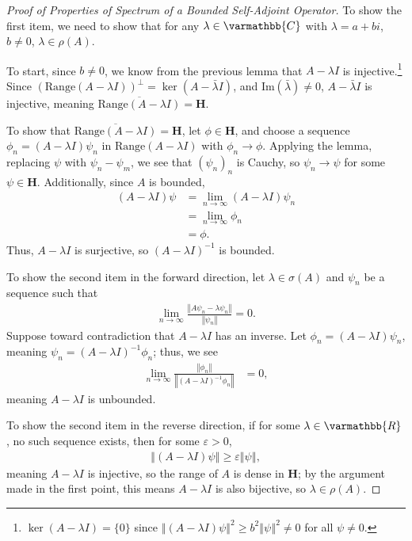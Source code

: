 \documentclass[12pt]{extarticle}
\newcommand{\R}{\varmathbb{R}}
\newcommand{\C}{\varmathbb{C}}
\newcommand{\norm}[1]{\left\Vert #1\right\Vert}
\theoremstyle{plain}
\theoremstyle{definition}
\theoremstyle{remark}
\renewcommand{\newline}{\hfill\break}
\begin{document}
  \begin{proof}[Proof of Properties of Spectrum of a Bounded Self-Adjoint Operator]
    To show the first item, we need to show that for any $\lambda \in \C$ with $\lambda = a + bi$, $b \neq 0$, $\lambda \in \rho(A)$.\newline

    To start, since $b\neq 0$, we know from the previous lemma that $A - \lambda I$ is injective.\footnote{$\ker(A - \lambda I) = \{0\}$ since $\norm{(A-\lambda I)\psi}^2 \geq b^2\norm{\psi}^2 \neq 0$ for all $\psi \neq 0$.} Since $\left(\text{Range}(A - \lambda I)\right)^{\perp} = \ker(A - \bar{\lambda}I)$, and $\text{Im}(\bar{\lambda}) \neq 0$, $A - \bar{\lambda} I$ is injective, meaning $\overline{\text{Range}(A - \lambda I)} = \mathbf{H}$.\newline

    To show that $\overline{\text{Range}(A - \lambda I)} = \mathbf{H}$, let $\phi \in \mathbf{H}$, and choose a sequence $\phi_n = (A - \lambda I)\psi_n$ in $\text{Range}(A - \lambda I)$ with $\phi_n \rightarrow \phi$. Applying the lemma, replacing $\psi$ with $\psi_n - \psi_m$, we see that $(\psi_n)_n$ is Cauchy, so $\psi_n \rightarrow \psi$ for some $\psi \in \mathbf{H}$. Additionally, since $A$ is bounded,
    \begin{align*}
      (A - \lambda I)\psi &= \lim_{n\rightarrow\infty}(A - \lambda I)\psi_n\\
                          &= \lim_{n\rightarrow\infty}\phi_n\\
                          &= \phi.
    \end{align*}
    Thus, $A - \lambda I$ is surjective, so $(A - \lambda I)^{-1}$ is bounded.\newline

    To show the second item in the forward direction, let $\lambda \in \sigma(A)$ and $\psi_n$ be a sequence such that
    \begin{align*}
      \lim_{n\rightarrow\infty}\frac{\norm{A\psi_n - \lambda \psi_n}}{\norm{\psi_n}} = 0.
    \end{align*}
    Suppose toward contradiction that $A - \lambda I$ has an inverse. Let $\phi_n = (A - \lambda I)\psi_n$, meaning $\psi_n = (A - \lambda I)^{-1}\phi_n$; thus, we see
    \begin{align*}
      \lim_{n\rightarrow\infty}\frac{\norm{\phi_n}}{\norm{(A - \lambda I)^{-1}\phi_n}} &= 0,
    \end{align*}
    meaning $A - \lambda I$ is unbounded.\newline

    To show the second item in the reverse direction, if for some $\lambda \in \R$, no such sequence exists, then for some $\varepsilon > 0$,
    \begin{align*}
      \norm{(A - \lambda I)\psi} \geq \varepsilon \norm{\psi},
    \end{align*}
    meaning $A - \lambda I$ is injective, so the range of $A$ is dense in $\mathbf{H}$; by the argument made in the first point, this means $A - \lambda I$ is also bijective, so $\lambda \in \rho(A)$.
  \end{proof}
\end{document}
